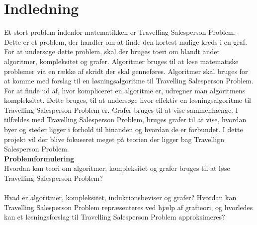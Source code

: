 \chapter{Indledning}
Et stort problem indenfor matematikken er Travelling Salesperson Problem. 
Dette er et problem, der handler om at finde den kortest mulige kreds i en graf. 
For at undersøge dette problem, skal der bruges toeri om blandt andet algoritmer, kompleksitet og grafer.
Algoritmer bruges til at løse matematiske problemer via en række af skridt der skal genneføres. 
Algoritmer skal bruges for at komme med forslag til en løsningsalgoritme til Travelling Salesperson Problem. 
For at finde ud af, hvor kompliceret en algoritme er, udregner man algoritmens kompleksitet. 
Dette bruges, til at undersøge hvor effektiv en løsningsalgoritme til Travelling Salesperson Problem er. 
Grafer bruges til at vise sammenhænge. 
I tilfældes med Travelling Salesperson Problem, bruges grafer til at vise, hvordan byer og steder ligger i forhold til hinanden og hvordan de er forbundet. 
I dette projekt vil der blive fokuseret meget på teorien der ligger bag Travellign Salesperson Problem.\\

\noindent \textbf{Problemformulering} \\
Hvordan kan teori om algoritmer, kompleksitet og grafer bruges til at løse Travelling Salesperson Problem?
\\\\
Hvad er algoritmer, kompleksitet, induktionsbeviser og grafer? Hvordan kan Travelling Salesperson Problem repræsenteres ved hjælp af grafteori, og hvorledes kan et løsningsforslag til Travelling Salesperson Problem approksimeres?
\\\\

